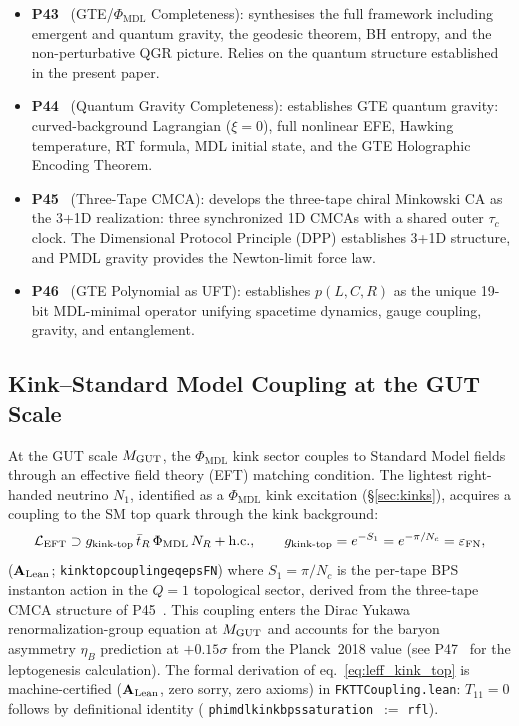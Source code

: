 \documentclass[11pt]{article}
\theoremstyle{remark}
\newcommand{\PHIMDL}{\Phi_{\mathrm{MDL}}}
\newcommand{\lean}[1]{%
  \penalty-100
  \begingroup\def\_{\textunderscore\allowbreak}\texttt{#1}\endgroup}
\newcommand{\CatAL}{\ensuremath{\textbf{A}_{\rm Lean}}}
\begin{document}
\begin{itemize}[noitemsep]
  \item \textbf{P43}~\cite{SpivackCompleteness} (GTE/$\PHIMDL$ Completeness):
    synthesises the full framework including emergent and quantum gravity,
    the geodesic theorem, BH entropy, and the non-perturbative QGR picture.
    Relies on the quantum structure established in the present paper.

  \item \textbf{P44}~\cite{SpivackQGR} (Quantum Gravity Completeness):
    establishes GTE quantum gravity: curved-background Lagrangian ($\xi=0$),
    full nonlinear EFE, Hawking temperature, RT formula, MDL initial state,
    and the GTE Holographic Encoding Theorem.

  \item \textbf{P45}~\cite{SpivackThreeTapeCMCA} (Three-Tape CMCA):
    develops the three-tape chiral Minkowski CA as the 3+1D realization:
    three synchronized 1D CMCAs with a shared outer $\tau_c$ clock.
    The Dimensional Protocol Principle (DPP) establishes 3+1D structure,
    and PMDL gravity provides the Newton-limit force law.

  \item \textbf{P46}~\cite{SpivackGTEPolynomialUFT} (GTE Polynomial as UFT):
    establishes $p(L,C,R)$ as the unique 19-bit MDL-minimal operator
    unifying spacetime dynamics, gauge coupling, gravity, and entanglement.
\end{itemize}

\subsection{Kink--Standard Model Coupling at the GUT Scale}
\label{ssec:kink_sm_gut}

At the GUT scale $M_{\rm GUT}$, the $\PHIMDL$ kink sector couples to Standard Model
fields through an effective field theory (EFT) matching condition.
The lightest right-handed neutrino $N_1$, identified as a $\PHIMDL$ kink excitation
(\S\ref{sec:kinks}), acquires a coupling to the SM top quark through the kink
background:
\begin{equation}\label{eq:leff_kink_top}
  \mathcal{L}_{\rm EFT} \supset g_{\rm kink\text{-}top}\,\bar{t}_R \,\PHIMDL \,N_R
  + \text{h.c.}, \qquad
  g_{\rm kink\text{-}top} = e^{-S_1} = e^{-\pi/N_c} = \varepsilon_{\rm FN},
\end{equation}
(\CatAL; \lean{kink\_top\_coupling\_eq\_eps\_FN})
where $S_1 = \pi/N_c$ is the per-tape BPS instanton action in the $Q=1$ topological
sector, derived from the three-tape CMCA structure of
P45~\cite{SpivackThreeTapeCMCA}.
This coupling enters the Dirac Yukawa renormalization-group equation at $M_{\rm GUT}$
and accounts for the baryon asymmetry $\eta_B$ prediction at $+0.15\sigma$ from
the Planck~2018 value (see P47~\cite{SpivackGTECosmology} for the leptogenesis
calculation).
The formal derivation of eq.~\eqref{eq:leff_kink_top} is machine-certified
(\CatAL, zero sorry, zero axioms) in \lean{FKTTCoupling.lean}:
$T_{11}=0$ follows by definitional identity (\lean{phi\_mdl\_kink\_bps\_saturation}\ $:=$ \lean{rfl}).
\end{document}
